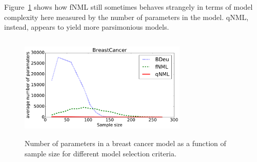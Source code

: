 \documentclass[letterpaper]{article}
\begin{document}
Figure~\ref{fig:bcnpmean} shows how fNML still sometimes behaves
strangely in terms of model complexity here measured by the number of
parameters in the model.  qNML, instead, appears to yield more
parsimonious models.

\begin{figure}
\centering
\includegraphics[width=8cm,height=5cm]{breast_cancer_np_mean.pdf}
\caption{Number of parameters in a breast cancer model as a function
  of sample size for different model selection criteria.}
\label{fig:bcnpmean}
\end{figure}
\end{document}
